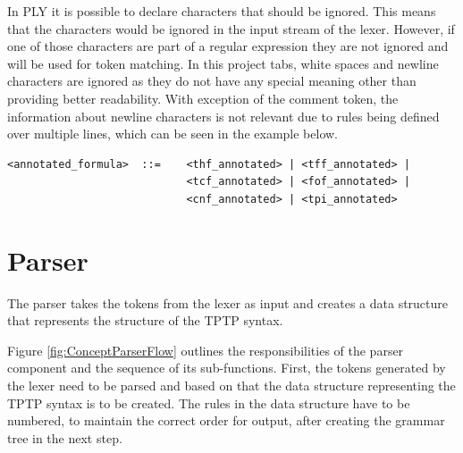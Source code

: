 In PLY it is possible to declare characters that should be ignored. This means that the characters would be ignored in the input stream of the lexer. However, if one of those characters are part of a regular expression they are not ignored and will be used for token matching. In this project tabs, white spaces and newline characters are ignored as they do not have any special meaning other than providing better readability. With exception of the comment token, the information about newline characters is not relevant due to rules being defined over multiple lines, which can be seen in the example below.
\begin{verbatim}
<annotated_formula>  ::=    <thf_annotated> | <tff_annotated> |
                            <tcf_annotated> | <fof_annotated> |
                            <cnf_annotated> | <tpi_annotated>
\end{verbatim}


\section{Parser}\label{sec:ConceptParser}
The parser takes the tokens from the lexer as input and creates a data structure that represents the structure of the \ac{TPTP} syntax.

Figure \ref{fig:ConceptParserFlow} outlines the responsibilities of the parser component and the sequence of its sub-functions.
First, the tokens generated by the lexer need to be parsed and based on that the data structure representing the \ac{TPTP} syntax is to be created.
The rules in the data structure have to be numbered, to maintain the correct order for output, after creating the grammar tree in the next step.

